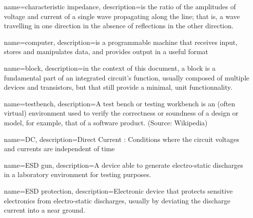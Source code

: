 %
%

{
  name=characteristic impedance,
  description={is the ratio of the amplitudes of voltage and current of a
               single wave propagating along the line;
               that is, a wave travelling in one direction in the absence of
               reflections in the other direction.}
}

{
  name=computer,
  description={is a programmable machine that receives input,
               stores and manipulates data, and provides
               output in a useful format}
}

{
  name=block,
  description={in the context of this document,
               a block is a fundamental part of an integrated circuit's function,
               usually composed of multiple devices and transistors,
               but that still provide a minimal, unit functionnality.}
}

{
  name=testbench,
  description={A test bench or testing workbench is an (often virtual)
               environment used to verify the correctness or soundness of a
               design or model, for example, that of a software product.
               (Source: Wikipedia)}
}

{
  name=DC,
  description={Direct Current : Conditions where the circuit voltages
               and currents are independent of time}
}

{
  name=ESD gun,
  description={A device able to generate electro-static discharges in a
               laboratory environment for testing purposes.}
}

{
  name=ESD protection,
  description={Electronic device that protects sensitive electronics from
               electro-static discharges, usually by deviating the discharge
               current into a near ground.}
}

